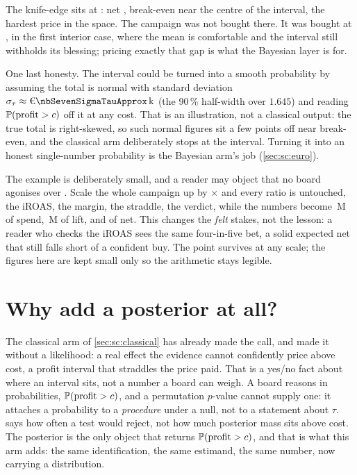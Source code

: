 The knife-edge sits at \keur{\nbSevenSweepKeC}: net \keur{\nbSevenSweepKeNet}, break-even
\keur{\nbSevenSweepKeBe} near the centre of the interval, the hardest price in the space. The campaign
was not bought there. It was bought at \keur{\nbSevenCost}, in the first interior case, where the mean
is comfortable and the interval still withholds its blessing; pricing exactly that gap is what the
Bayesian layer is for.

One last honesty. The interval could be turned into a smooth probability by assuming the total is
normal with standard deviation $\sigma_\tau \approx \keur{\nbSevenSigmaTauApprox}$ (the 90\,\%
half-width over $1.645$) and reading $\operatorname{\mathbb{P}}(\text{profit} > c)$ off it at any cost. That is an
illustration, not a classical output: the true total is right-skewed, so such normal figures sit a few
points off near break-even, and the classical arm deliberately stops at the interval. Turning it into
an honest single-number probability is the Bayesian arm's job (\cref{sec:sc:euro}).

\begin{remark}
The example is deliberately small, and a reader may object that no board agonises over
\keur{\nbSevenClNet}. Scale the whole campaign up by \nbSevenFeltN$\times$ and every ratio is
untouched, the iROAS, the margin, the straddle, the verdict, while the numbers become
\eur{\nbSevenFeltSpend}\,M of spend, \eur{\nbSevenFeltLift}\,M of lift, and \keur{\nbSevenFeltNet} of
net. This changes the \emph{felt} stakes, not the lesson: a reader who checks the iROAS sees the same
four-in-five bet, a solid expected net that still falls short of a confident buy. The point survives at any scale; the figures here are kept
small only so the arithmetic stays legible.
\end{remark}

\section{Why add a posterior at all?}
\label{sec:sc:bayes}

The classical arm of \cref{sec:sc:classical} has already made the call, and made it without a
likelihood: a real effect the evidence cannot confidently price above cost, a profit interval that
straddles the price paid. That is a yes/no fact about where an interval sits, not a number a board
can weigh. A board reasons in probabilities, $\operatorname{\mathbb{P}}(\text{profit} > c)$, and a permutation
$p$-value cannot supply one: it attaches a probability to a \emph{procedure} under a null, not to a
statement about $\tau$.  says how often a test would reject, not how much posterior
mass sits above cost. The posterior is the only object that returns $\operatorname{\mathbb{P}}(\text{profit} > c)$, and
that is what this arm adds: the same identification, the same estimand, the same number, now
carrying a distribution.


